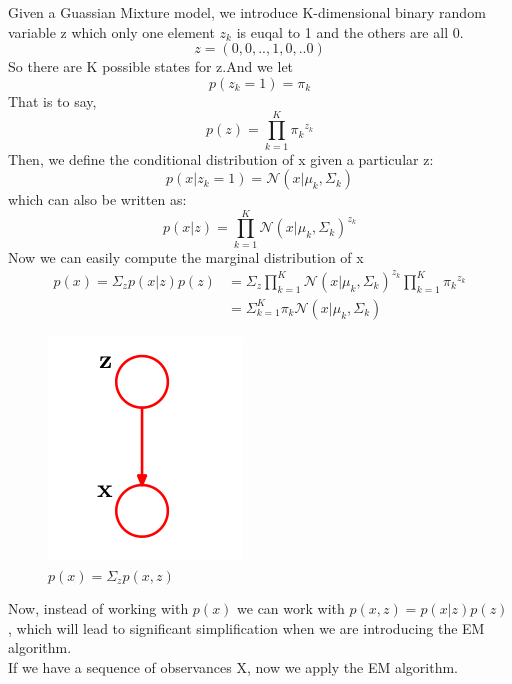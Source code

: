 \documentclass[11pt]{article}
\begin{document}
Given a Guassian Mixture model, we introduce K-dimensional binary random variable z which only one element $z_k$ is euqal to 1 and the others are all 0.\\
\begin{equation}
z=(0,0,..,1,0,..0)
\end{equation}
So there are K possible states for z.And we let
\begin{equation}
p(z_k=1) = \pi_k
\end{equation}
That is to say, 
\begin{equation}
p(z) = \prod^K_{k=1}{\pi_k}^{z_k}
\end{equation}
Then, we define the conditional distribution of x given a particular z:
\begin{equation}
p(x|z_k=1)=\mathcal{N}(x|\mu_k,\Sigma_k)
\end{equation}
which can also be written as:
\begin{equation}
p(x|z)=\prod^K_{k=1}{\mathcal{N}(x|\mu_k,\Sigma_k)}^{z_k}
\end{equation}
Now we can easily compute the marginal distribution of x
\begin{displaymath}
\begin{split}
p(x) = \Sigma_zp(x|z)p(z) &= \Sigma_z\prod^K_{k=1}{\mathcal{N}(x|\mu_k,\Sigma_k)}^{z_k}
\prod^K_{k=1}{\pi_k}^{z_k}\\
 &=\Sigma^K_{k=1}\pi_k\mathcal{N}(x|\mu_k,\Sigma_k)
\end{split}
\end{displaymath}
\begin{figure}[htp]
\centering
\includegraphics[scale=0.30]{latent-variable.png}
\caption{$p(x)=\Sigma_z p(x,z)$}
\label{}
\end{figure}
Now, instead of working with $p(x)$ we can work with $p(x,z) = p(x|z)p(z)$, which will lead to significant simplification when we are introducing the EM algorithm.\\
If we have a sequence of observances X, now we apply the EM algorithm.
\end{document}
